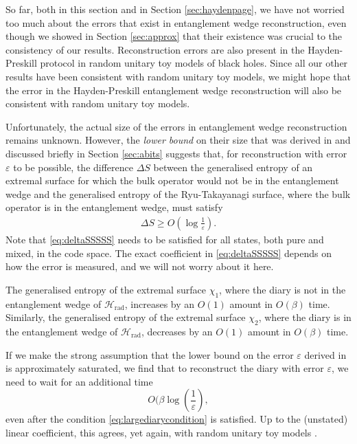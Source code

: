 \documentclass[11pt,a4paper]{article}
\begin{document}
So far, both in this section and in Section \ref{sec:haydenpage}, we have not worried too much about the errors that exist in entanglement wedge reconstruction, even though we showed in Section \ref{sec:approx} that their existence was crucial to the consistency of our results. Reconstruction errors are also present in the Hayden-Preskill protocol in random unitary toy models of black holes. Since all our other results have been consistent with random unitary toy models, we might hope that the error in the Hayden-Preskill entanglement wedge reconstruction will also be consistent with random unitary toy models.

Unfortunately, the actual size of the errors in entanglement wedge reconstruction remains unknown. However, the \emph{lower bound} on their size that was derived in \cite{hayden2018learning} and discussed briefly in Section \ref{sec:abits} suggests that, for reconstruction with error $\varepsilon$ to be possible, the difference $\Delta S$ between the generalised entropy of an extremal surface for which the bulk operator would not be in the entanglement wedge and the generalised entropy of the Ryu-Takayanagi surface, where the bulk operator is in the entanglement wedge, must satisfy
\begin{align} \label{eq:deltaSSSSS}
\Delta S \geq O(\log \frac{1}{\varepsilon}).
\end{align}
Note that \eqref{eq:deltaSSSSS} needs to be satisfied for all states, both pure and mixed, in the code space. The exact coefficient in \eqref{eq:deltaSSSSS} depends on how the error is measured, and we will not worry about it here. 

The generalised entropy of the extremal surface $\chi_1$, where the diary is not in the entanglement wedge of $\mathcal{H}_\text{rad}$, increases by an $O(1)$ amount in $O(\beta)$ time. Similarly, the generalised entropy of the extremal surface $\chi_2$, where the diary is in the entanglement wedge of $\mathcal{H}_\text{rad}$, decreases by an $O(1)$ amount in $O(\beta)$ time.

If we make the strong assumption that the lower bound on the error $\varepsilon$ derived in \cite{hayden2018learning} is approximately saturated, we find that to reconstruct the diary with error $\varepsilon$, we need to wait for an additional time
$$
O(\beta \log(\frac{1}{\varepsilon}),
$$
even after the condition \eqref{eq:largediarycondition} is satisfied. Up to the (unstated) linear coefficient, this agrees, yet again, with random unitary toy models \cite{hayden2007black, alphabits}.
\end{document}
